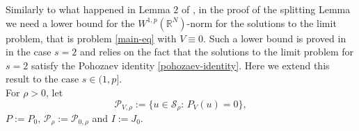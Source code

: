 \documentclass[11pt,reqno]{amsart}
\theoremstyle{definition}
\numberwithin{equation}{section}
\numberwithin{theorem}{section}
\numberwithin{equation}{section}
\numberwithin{theorem}{section}
\newcommand{\R}{\mathbb{R}}
\begin{document}
Similarly to what happened in Lemma $2$ of \cite{dhara2025normalised}, in the proof of the splitting Lemma we need a lower bound for the $W^{1,p}(\R^N)$-norm for the solutions to the limit problem, that is problem \eqref{main-eq} with $V\equiv 0$. Such a lower bound is proved in \cite{dhara2025normalised} in the case $s=2$ and relies on the fact that the solutions to the limit problem for $s=2$ satisfy the Pohozaev identity \eqref{pohozaev-identity}. Here we extend this result to the case $s\in(1,p]$.\\

For $\rho>0$, let
\begin{equation}
\mathcal{P}_{V,\rho}:=\{u\in \mathcal{S}_\rho:\,P_V(u)=0\},  
\end{equation}
$P:=P_0,\,\mathcal{P}_{\rho}:=\mathcal{P}_{0,\rho}$ and $I:=J_0$.\\ 
\end{document}
